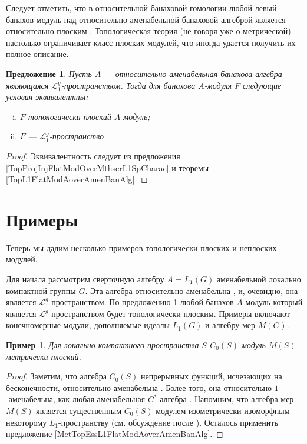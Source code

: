\documentclass[12pt]{article}
\newtheorem{proposition}[theorem]{Предложение}
\newtheorem{example}[theorem]{Пример}
\begin{document}
Следует отметить, что в относительной банаховой гомологии любой левый банахов модуль над относительно аменабельной банаховой алгеброй является относительно плоским \cite[теорема 7.1.60]{HelBanLocConvAlg}. Топологическая теория  (не говоря уже о метрической) настолько ограничивает класс плоских модулей, что иногда удается получить их полное описание.

\begin{proposition}\label{TopFlatModAoverAmenL1BanAlgCharac} Пусть $A$ --- относительно аменабельная банахова алгебра являющаяся $\mathcal{L}_1^g$-пространством. Тогда для банахова $A$-модуля $F$ следующие условия эквивалентны:
\begin{enumerate}[i)]
\item $F$ топологически плоский $A$-модуль;
\item $F$ --- $\mathcal{L}_1^g$-пространство.
\end{enumerate}
\end{proposition}
\begin{proof} Эквивалентность следует из предложения \ref{TopProjInjFlatModOverMthscrL1SpCharac} и теоремы \ref{TopL1FlatModAoverAmenBanAlg}.
\end{proof}


\section{Примеры}
\label{SectionAFewExamples}

Теперь мы дадим несколько примеров топологически плоских и неплоских модулей. 

Для начала рассмотрим сверточную алгебру $A=L_1(G)$ аменабельной локально компактной группы $G$. Эта алгебра относительно аменабельна \cite[предложение VII.1.86]{HelBanLocConvAlg}, и, очевидно, она является $\mathcal{L}_1^g$-пространством. По предложению \ref{TopFlatModAoverAmenL1BanAlgCharac} любой банахов $A$-модуль который является $\mathcal{L}_1^g$-пространством будет топологически плоским. Примеры включают конечномерные модули, дополняемые идеалы $L_1(G)$ и алгебру мер $M(G)$.

\begin{example} Для локально компактного пространства $S$ $C_0(S)$-модуль $M(S)$ метрически плоский.
\end{example}
\begin{proof}
Заметим, что алгебра $C_0(S)$ непрерывных функций, исчезающих на бесконечности, относительно аменабельна \cite[теорема 7.1.87]{HelBanLocConvAlg}. Более того, она относительно $1$-аменабельна, как любая аменабельная $C^*$-алгебра \cite[пример 2]{RundeAmenConstFour}. Напомним, что алгебра мер $M(S)$ является существенным $C_0(S)$-модулем изометрически изоморфным некоторому $L_1$-пространству (см. обсуждение после \cite[предложение 2.14]{DalLauSecondDualOfMeasAlg}). Осталось применить предложение \ref{MetTopEssL1FlatModAoverAmenBanAlg}.
\end{proof}
\end{document}
